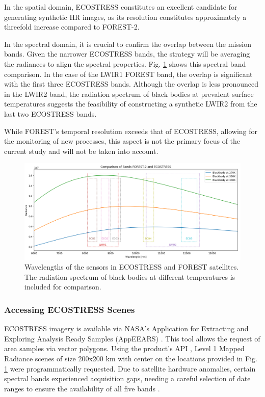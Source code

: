 In the spatial domain, ECOSTRESS constitutes an excellent candidate for generating synthetic HR images, as its resolution constitutes approximately a threefold increase compared to FOREST-2. 

In the spectral domain, it is crucial to confirm the overlap between the mission bands. Given the narrower ECOSTRESS bands, the strategy will be averaging the radiances to align the spectral properties.
Fig. \ref{fig:5-wavelength-comparison} shows this spectral band comparison.
In the case of the LWIR1 FOREST band, the overlap is significant with the first three ECOSTRESS bands.
Although the overlap is less pronounced in the LWIR2 band, the radiation spectrum of black bodies at prevalent surface temperatures suggests the feasibility of constructing a synthetic LWIR2 from the last two ECOSTRESS bands.

While FOREST's temporal resolution exceeds that of ECOSTRESS, allowing for the monitoring of new processes, this aspect is not the primary focus of the current study and will not be taken into account.



\begin{figure}[H]
    \centering
    \includegraphics[width=\linewidth]{Includes/5-wavelength-comparison.png}
    \caption{Wavelengths of the sensors in ECOSTRESS and FOREST satellites. The radiation spectrum of black bodies at different temperatures is included for comparison.}
    \label{fig:5-wavelength-comparison}
\end{figure}

\subsubsection{Accessing ECOSTRESS Scenes}
    ECOSTRESS imagery is available via NASA's Application for Extracting and Exploring Analysis Ready Samples (AppEEARS) \cite{AppEEARS2023}. This tool allows the request of area samples via vector polygons. Using the product's API \cite{AppEEARSAPI2023}, Level 1 Mapped Radiance scenes of size 200x200 km with center on the locations provided in Fig. \ref{fig:5-wavelength-comparison} were programmatically requested. Due to satellite hardware anomalies, certain spectral bands experienced acquisition gaps, needing a careful selection of date ranges to ensure the availability of all five bands \cite{ECO1BMAPRAD2023}.

